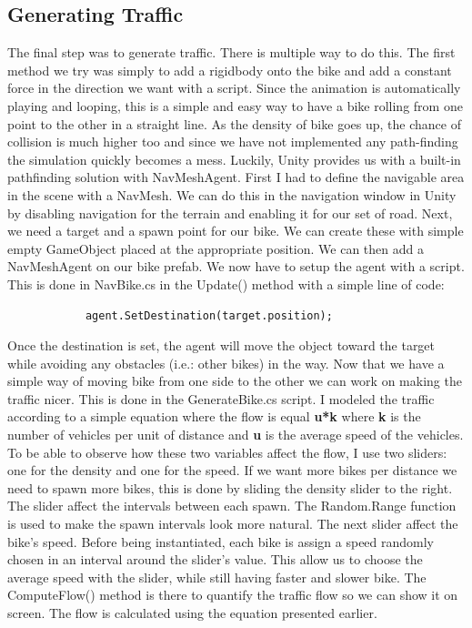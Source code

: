 \documentclass{scrartcl}
\begin{document}
	\subsection{Generating Traffic}
		The final step was to generate traffic. There is multiple way to do this. The first method we try was simply to add a rigidbody onto the bike and 
		add a constant force in the direction we want with a script. Since the animation is automatically playing and looping, this is a simple and easy way 
		to have a bike rolling from one point to the other in a straight line. As the density of bike goes up, the chance of collision is much higher too and 
		since we have not implemented any path-finding the simulation quickly becomes a mess. Luckily, Unity provides us with a built-in pathfinding solution 
		with NavMeshAgent. First I had to define the navigable area in the scene with a NavMesh. We can do this in the navigation window in Unity by disabling 
		navigation for the terrain and enabling it for our set of road. Next, we need a target and a spawn point for our bike. We can create these with simple 
		empty GameObject placed at the appropriate position. We can then add a NavMeshAgent on our bike prefab. We now have to setup the agent with a script.
		This is done in NavBike.cs in the Update() method with a simple line of code: 
		
		\begin{lstlisting}
		    agent.SetDestination(target.position);
		\end{lstlisting}
		
		Once the destination is set, the agent will move the object toward the target while avoiding any obstacles (i.e.: other bikes)  in the way. Now that we 
		have a simple way of moving bike from one side to the other we can work on making the traffic nicer. This is done in the GenerateBike.cs script. I modeled 
		the traffic according to a simple equation where the flow is equal \textbf{u*k} where \textbf{k} is the number of vehicles per unit of distance and \textbf{u} 
		is the average speed of the vehicles. To be able to observe how these two variables affect the flow, I use two sliders: one for the density and one for the speed. 
		If we want more bikes per distance we need to spawn more bikes, this is done by sliding the density slider to the right. The slider affect the intervals between each 
		spawn. The Random.Range function is used to make the spawn intervals look more natural. The next slider affect the bike's speed. Before being instantiated, each bike 
		is assign a speed randomly chosen in an interval around the slider's value. This allow us to choose the average speed with the slider, while still having faster and slower 
		bike. The ComputeFlow() method is there to quantify the traffic flow so we can show it on screen. The flow is calculated using the equation presented earlier.
		
\end{document}
